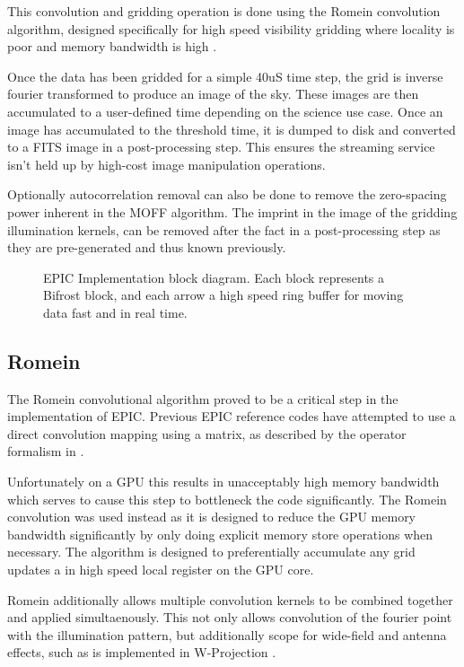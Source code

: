 \documentclass[bibliography=totocnumbered, twocolumn]{article}
\begin{document}
This convolution and gridding operation is done using the Romein
convolution algorithm, designed specifically for high speed
visibility gridding where locality is poor and memory bandwidth
is high \citep{romein_efficient_2012}.

Once the data has been gridded for a simple 40uS time step, the
grid is inverse fourier transformed to produce an image of the
sky. These images are then accumulated to a user-defined time
depending on the science use case. Once an image has accumulated
to the threshold time, it is dumped to disk and converted to a FITS
image in a post-processing step. This ensures the streaming service
isn't held up by high-cost image manipulation operations.

Optionally autocorrelation removal can also be done to remove
the zero-spacing power inherent in the MOFF algorithm. The
imprint in the image of the gridding illumination kernels, can be removed
after the fact in a post-processing step as they are
pre-generated and thus known previously.


\begin{figure}
  \centering
  \scalebox{0.5}{}
  \caption{EPIC Implementation block diagram. Each block represents a Bifrost block, and each arrow a high speed ring buffer for moving data fast and in real time.}
  \label{fig:pipeline}
\end{figure}

\subsection{Romein}

The Romein convolutional algorithm proved to be a critical
step in the implementation of EPIC. Previous EPIC reference codes
have attempted to use a direct convolution mapping using a matrix,
as described by the operator formalism in \citep{thyagarajan_generic_2017}.

Unfortunately on a GPU this results in unacceptably high
memory bandwidth which serves to cause this step to bottleneck
the code significantly. The Romein convolution was used instead as it
is designed to reduce the GPU memory bandwidth significantly
by only doing explicit memory store operations when necessary.
The algorithm is designed to preferentially accumulate any grid
updates a in high speed local register on the GPU core.

Romein additionally allows multiple convolution kernels to be
combined together and applied simultaenously. This not
only allows convolution of the fourier point with the
illumination pattern, but additionally scope for wide-field
and antenna effects, such as is implemented in W-Projection \citep{cornwell_noncoplanar_2008}.
\end{document}
